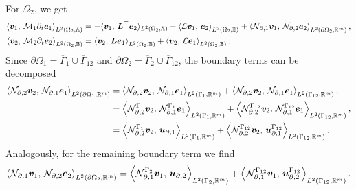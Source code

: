For $\Omega_2$, we get
\begin{equation}\label{eq:pHlinsys_weak_Om2}
\begin{aligned}
\inner[L^2(\Omega_2, \mathbb{A})]{\bm{v}_1}{\mathcal{M}_1 \partial_t \bm{e}_1} &=   -  \langle{\bm{v}_1}, \,{\bm{L}^\top \bm{e}_2}\rangle_{L^2(\Omega_2, \mathbb{A})}  -\inner[L^2(\Omega_2, \mathbb{B})]{\mathcal{L}\bm{v}_1}{\bm{e}_2} + \inner[L^2(\partial\Omega_2, \mathbb{R}^m)]{\mathcal{N}_{\partial, 1} \bm{v}_1}{\mathcal{N}_{\partial, 2}\bm{e}_2}, \\
\inner[L^2(\Omega_2, \mathbb{B})]{\bm{v}_2}{\mathcal{M}_2 \partial_t \bm{e}_2} &=   \inner[L^2(\Omega_2, \mathbb{B})]{\bm{v}_2}{\bm{L}\bm{e}_1} + \inner[L^2(\Omega_2, \mathbb{B})]{\bm{v}_2}{\mathcal{L}\bm{e}_1}. \\
\end{aligned}
\end{equation}
Since $\partial\Omega_1 = \overline{\Gamma}_1 \cup \overline\Gamma_{12}$ and $\partial\Omega_2 = \overline\Gamma_2 \cup \overline\Gamma_{12}$, the boundary terms can be decomposed 
\begin{equation}\label{eq:bdsplit_Om1}
\begin{aligned}
\inner[L^2(\partial\Omega_1, \mathbb{R}^m)]{\mathcal{N}_{\partial, 2} \bm{v}_2}{\mathcal{N}_{\partial, 1}\bm{e}_1} &= \inner[L^2(\Gamma_1, \mathbb{R}^m)]{\mathcal{N}_{\partial, 2} \bm{v}_2}{\mathcal{N}_{\partial, 1}\bm{e}_1} + \inner[L^2(\Gamma_{12}, \mathbb{R}^m)]{\mathcal{N}_{\partial, 2} \bm{v}_2}{\mathcal{N}_{\partial, 1}\bm{e}_1}, \\
&= \inner[L^2(\Gamma_1, \mathbb{R}^m)]{\mathcal{N}_{\partial, 2}^{\Gamma_1} \bm{v}_2}{\mathcal{N}_{\partial, 1}^{\Gamma_1} \bm{e}_1} + \inner[L^2(\Gamma_{12}, \mathbb{R}^m)]{\mathcal{N}_{\partial, 2}^{\Gamma_{12}} \bm{v}_2}{\mathcal{N}_{\partial, 1}^{\Gamma_{12}}\bm{e}_1}, \\
&= \inner[L^2(\Gamma_1, \mathbb{R}^m)]{\mathcal{N}_{\partial, 2}^{\Gamma_1} \bm{v}_2}{\bm{u}_{\partial, 1}} + \inner[L^2(\Gamma_{12}, \mathbb{R}^m)]{\mathcal{N}_{\partial, 2}^{\Gamma_{12}} \bm{v}_2}{\bm{u}_{\partial, 1}^{\Gamma_{12}}}.
\end{aligned}
\end{equation}
Analogously, for the remaining boundary term we find
\begin{equation}\label{eq:bdsplit_Om2}
\begin{aligned}
\inner[L^2(\partial\Omega_2, \mathbb{R}^m)]{\mathcal{N}_{\partial,1} \bm{v}_1}{\mathcal{N}_{\partial, 2}\bm{e}_2} = \inner[L^2(\Gamma_2, \mathbb{R}^m)]{\mathcal{N}_{\partial, 1}^{\Gamma_2} \bm{v}_1}{\bm{u}_{\partial, 2}} + \inner[L^2(\Gamma_{12}, \mathbb{R}^m)]{\mathcal{N}_{\partial, 1}^{\Gamma_{12}} \bm{v}_1}{\bm{u}_{\partial, 2}^{\Gamma_{12}}}.
\end{aligned}
\end{equation}

